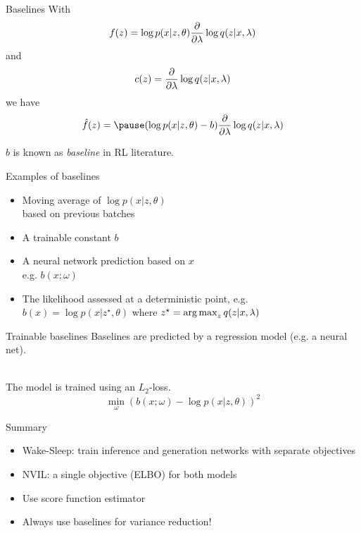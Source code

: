 \begin{frame}{Baselines}
With
\begin{equation*}
f(z) = \log p(x|z, \theta) \pdv{\lambda} \log q(z|x, \lambda)
\end{equation*}
and 
\begin{equation*}
c(z) = \pdv{\lambda} \log q(z|x, \lambda)
\end{equation*}
we have 
\begin{equation*}
\hat f(z) = \pause (\log p(x|z, \theta) - b) \pdv{\lambda} \log q(z|x, \lambda) 
\end{equation*}

\pause
$b$ is known as \emph{baseline} in RL literature.
\end{frame}

\begin{frame}{Examples of baselines}

\begin{itemize}
	\item Moving average of $\log p(x|z, \theta)$ \\
	 based on previous batches \pause
	\item A trainable constant $b$ \pause
	\item A neural network prediction based on $x$\\
	e.g. $b(x; \omega)$ \pause
	\item The likelihood assessed at a deterministic point, e.g. \\
	$b(x) = \log p(x|z^\star, \theta)$ where $z^\star = \operatorname*{arg\,max}_z q(z|x, \lambda)$
\end{itemize}
\end{frame}


\begin{frame}{Trainable baselines}
Baselines are predicted by a regression model (e.g. a neural net). \\

~

The model is trained using 
an $ L_{2} $-loss.
\begin{equation*}
\min_\omega \left(b(x; \omega) - \log p(x|z,\theta)\right)^{2}
\end{equation*}
\end{frame}




\begin{frame}{Summary}
\begin{itemize}
\item Wake-Sleep: train inference and generation networks with separate objectives
\pause
\item NVIL: a single objective (ELBO) for both models\\ \pause
\item Use score function estimator\\ 
\pause
\item Always use baselines for variance reduction!
\end{itemize}
\end{frame}


